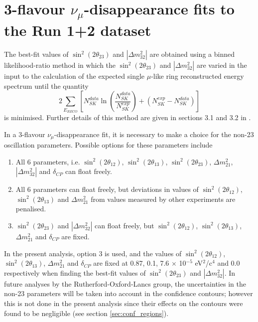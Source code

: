 \clearpage

\section{3-flavour $\nu_{\mu}$-disappearance fits to the Run 1+2 dataset}
\label{sec:fits}

The best-fit values of $\sin^{2}(2 \theta_{23})$ and $|\Delta m_{32}^{2}|$ are obtained using a binned likelihood-ratio method 
in which the $\sin^{2}(2 \theta_{23})$ and $|\Delta m_{32}^{2}|$ are varied in the input to the calculation of the expected single 
$\mu$-like ring reconstructed energy spectrum until the quantity
\begin{equation}
  2 \sum_{E_{RECO}} \left[N^{data}_{SK} \ln \left(\frac{N^{data}_{SK}}{N^{exp}_{SK}}\right) + (N^{exp}_{SK} - N^{data}_{SK})  \right]
\end{equation}
is minimised. Further details of this method are given in sections 3.1 and 3.2 in \cite{OurRun1DisappAnalysis2F}. 

In a 3-flavour $\nu_{\mu}$-disappearance fit, it is necessary to make a choice for the non-23 oscillation parameters. Possible 
options for these parameters include
\begin{enumerate}
\item All 6 parameters, i.e. $\sin^{2}(2 \theta_{12})$, $\sin^{2}(2 \theta_{13})$, $\sin^{2}(2 \theta_{23})$, $\Delta m_{21}^{2}$, 
$|\Delta m_{32}^{2}|$ and $\delta_{CP}$ can float freely.
\item All 6 parameters can float freely, but deviations in values of $\sin^{2}(2 \theta_{12})$, $\sin^{2}(2 \theta_{13})$ and 
$\Delta m_{21}^{2}$ from values measured by other experiments are penalised.
\item $\sin^{2}(2 \theta_{23})$ and $|\Delta m_{32}^{2}|$ can float freely, but $\sin^{2}(2 \theta_{12})$, $\sin^{2}(2 \theta_{13})$, 
$\Delta m_{21}^{2}$ and $\delta_{CP}$ are fixed.
\end{enumerate}

In the present analysis, option 3 is used, and the values of $\sin^{2}(2 \theta_{12})$, $\sin^{2}(2 \theta_{13})$, $\Delta m_{21}^{2}$ 
and $\delta_{CP}$ are fixed at 0.87, 0.1, 7.6 $\times$ 10$^{-5}$ eV$^{2}$/c$^{4}$ and 0.0 respectively when finding the best-fit values of 
$\sin^{2}(2 \theta_{23})$ and $|\Delta m_{32}^{2}|$. In future analyses by the Rutherford-Oxford-Lancs group, the uncertainties in the 
non-23 parameters will be taken into account in the confidence contours; however this is not done in the present analysis since their 
effects on the contours were found to be negligible (see section \ref{sec:conf_regions}).  

